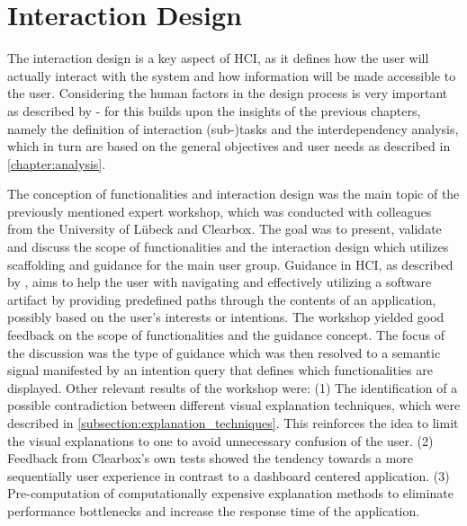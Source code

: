 \documentclass[11pt,a4paper,english]{scrreprt}
\begin{document}
\section{Interaction Design}\label{section:interaction_design}
The interaction design is a key aspect of HCI, as it defines how the user will actually interact with the system and how information will be made accessible to the user. Considering the human factors in the design process is very important as described by \textcite{wickens_2016_engineering} - for this builds upon the insights of the previous chapters, namely the definition of interaction (sub-)tasks and the interdependency analysis, which in turn are based on the general objectives and user needs as described in \autoref{chapter:analysis}.

The conception of functionalities and interaction design was the main topic of the previously mentioned expert workshop, which was conducted with colleagues from the University of Lübeck and Clearbox. The goal was to present, validate and discuss the scope of functionalities and the interaction design which utilizes scaffolding and guidance for the main user group. Guidance in HCI, as described by \textcite{trigg_guided_1988}, aims to help the user with navigating and effectively utilizing a software artifact by providing predefined paths through the contents of an application, possibly based on the user's interests or intentions. The workshop yielded good feedback on the scope of functionalities and the guidance concept. The focus of the discussion was the type of guidance which was then resolved to a semantic signal manifested by an intention query that defines which functionalities are displayed. Other relevant results of the workshop were: (1) The identification of a possible contradiction between different visual explanation techniques, which were described in \autoref{subsection:explanation_techniques}. This reinforces the idea to limit the visual explanations to one to avoid unnecessary confusion of the user. (2) Feedback from Clearbox's own tests showed the tendency towards a more sequentially user experience in contrast to a dashboard centered application. (3) Pre-computation of computationally expensive explanation methods to eliminate performance bottlenecks and increase the response time of the application.
\end{document}
